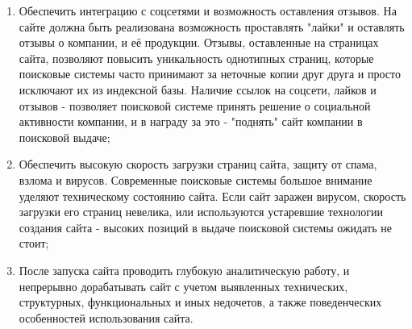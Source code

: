 \begin{enumerate}
    \item Обеспечить интеграцию с соцсетями и возможность оставления отзывов. На сайте должна быть реализована возможность проставлять "лайки" и оставлять отзывы о компании, и её продукции.
    Отзывы, оставленные на страницах сайта, позволяют повысить уникальность однотипных страниц, которые поисковые системы часто принимают за неточные копии друг друга и просто исключают их из индексной базы.
    Наличие ссылок на соцсети, лайков и отзывов - позволяет поисковой системе принять решение о социальной активности компании, и в награду за это - "поднять" сайт компании в поисковой выдаче;
    \item Обеспечить высокую скорость загрузки страниц сайта, защиту от спама, взлома и вирусов.
    Современные поисковые системы большое внимание уделяют техническому состоянию сайта.
     Если сайт заражен вирусом, скорость загрузки его страниц невелика, или используются устаревшие технологии создания сайта - высоких позиций в выдаче поисковой системы ожидать не стоит;
    \item После запуска сайта проводить глубокую аналитическую работу, и непрерывно дорабатывать сайт с учетом выявленных технических, структурных, функциональных и иных недочетов, а также поведенческих особенностей использования сайта.
  \end{enumerate}

